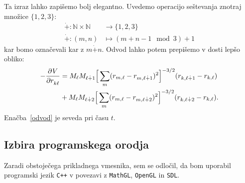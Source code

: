 \documentclass[12pt, a4paper]{article}
\newcommand{\der}[3][]{
    \ensuremath{ \frac{\partial^{#1} #2}{\partial #3^{#1}} }
}
\newcommand{\pl}{
    \ensuremath{\dot{+}}
}
\begin{document}
Ta izraz lahko zapi\v semo bolj elegantno. Uvedemo operacijo se\v stevanja znotraj mno\v zice $\{1,2,3\}$:
\begin{align*}
    \pl : \mathbb{N} \times \mathbb{N} &\to \{1,2,3\} \\
    \pl : (m,n) &\mapsto (m + n - 1 \mod 3) + 1
\end{align*}
kar bomo ozna\v cevali kar z $m\pl n$. Odvod lahko potem prepi\v semo v dosti lep\v so obliko:
\begin{align}
    -\der{V}{r_{k\ell}} &= M_\ell M_{\ell \pl 1} \Big[\sum_m(r_{m,\ell} - r_{m,\ell\pl1})^2\Big]^{-3/2}(r_{k,\ell\pl1}
        - r_{k,\ell}) \notag \\
    &+ M_\ell M_{\ell\pl2}\Big[\sum_m(r_{m,\ell} - r_{m,\ell\pl2})^2\Big]^{-3/2}(r_{k,\ell\pl2} - r_{k,\ell}).
    \label{odvod}
\end{align}
Ena\v cba~\eqref{odvod} je seveda pri \v casu $t$.

\subsection{Izbira programskega orodja}

Zaradi obstoje\v cega prikladnega vmesnika, sem se odlo\v cil, da bom uporabil programski jezik {\tt C++} v povezavi
z {\tt MathGL}, {\tt OpenGL} in {\tt SDL}.
\end{document}
